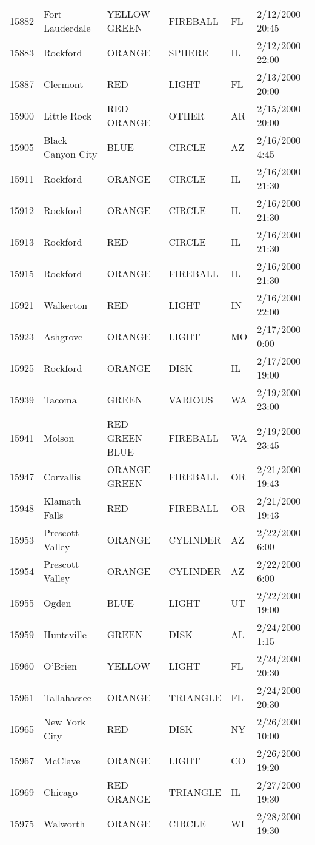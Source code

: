 \begin{tabular}{llllll}
15882 & Fort Lauderdale & YELLOW GREEN & FIREBALL & FL & 2/12/2000 20:45 \\
15883 & Rockford & ORANGE & SPHERE & IL & 2/12/2000 22:00 \\
15887 & Clermont & RED & LIGHT & FL & 2/13/2000 20:00 \\
15900 & Little Rock & RED ORANGE & OTHER & AR & 2/15/2000 20:00 \\
15905 & Black Canyon City & BLUE & CIRCLE & AZ & 2/16/2000 4:45 \\
15911 & Rockford & ORANGE & CIRCLE & IL & 2/16/2000 21:30 \\
15912 & Rockford & ORANGE & CIRCLE & IL & 2/16/2000 21:30 \\
15913 & Rockford & RED & CIRCLE & IL & 2/16/2000 21:30 \\
15915 & Rockford & ORANGE & FIREBALL & IL & 2/16/2000 21:30 \\
15921 & Walkerton & RED & LIGHT & IN & 2/16/2000 22:00 \\
15923 & Ashgrove & ORANGE & LIGHT & MO & 2/17/2000 0:00 \\
15925 & Rockford & ORANGE & DISK & IL & 2/17/2000 19:00 \\
15939 & Tacoma & GREEN & VARIOUS & WA & 2/19/2000 23:00 \\
15941 & Molson & RED GREEN BLUE & FIREBALL & WA & 2/19/2000 23:45 \\
15947 & Corvallis & ORANGE GREEN & FIREBALL & OR & 2/21/2000 19:43 \\
15948 & Klamath Falls & RED & FIREBALL & OR & 2/21/2000 19:43 \\
15953 & Prescott Valley & ORANGE & CYLINDER & AZ & 2/22/2000 6:00 \\
15954 & Prescott Valley & ORANGE & CYLINDER & AZ & 2/22/2000 6:00 \\
15955 & Ogden & BLUE & LIGHT & UT & 2/22/2000 19:00 \\
15959 & Huntsville & GREEN & DISK & AL & 2/24/2000 1:15 \\
15960 & O'Brien & YELLOW & LIGHT & FL & 2/24/2000 20:30 \\
15961 & Tallahassee & ORANGE & TRIANGLE & FL & 2/24/2000 20:30 \\
15965 & New York City & RED & DISK & NY & 2/26/2000 10:00 \\
15967 & McClave & ORANGE & LIGHT & CO & 2/26/2000 19:20 \\
15969 & Chicago & RED ORANGE & TRIANGLE & IL & 2/27/2000 19:30 \\
15975 & Walworth & ORANGE & CIRCLE & WI & 2/28/2000 19:30 \\

\end{tabular}
